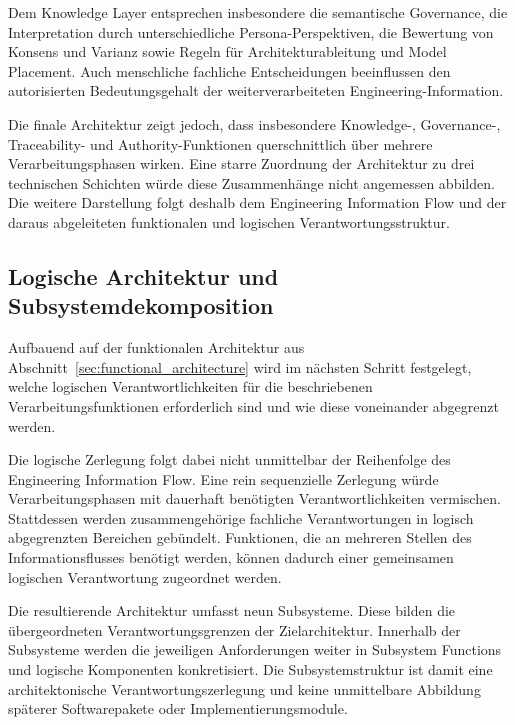 Dem Knowledge Layer entsprechen insbesondere die semantische Governance, die
Interpretation durch unterschiedliche Persona-Perspektiven, die Bewertung von
Konsens und Varianz sowie Regeln für Architekturableitung und Model Placement.
Auch menschliche fachliche Entscheidungen beeinflussen den autorisierten
Bedeutungsgehalt der weiterverarbeiteten Engineering-Information.

Die finale Architektur zeigt jedoch, dass insbesondere Knowledge-,
Governance-, Traceability- und Authority-Funktionen querschnittlich über mehrere
Verarbeitungsphasen wirken. Eine starre Zuordnung der Architektur zu drei
technischen Schichten würde diese Zusammenhänge nicht angemessen abbilden.
Die weitere Darstellung folgt deshalb dem Engineering Information Flow und der
daraus abgeleiteten funktionalen und logischen Verantwortungsstruktur.

\subsection{Logische Architektur und Subsystemdekomposition}
\label{sec:logical_subsystems}

Aufbauend auf der funktionalen Architektur aus
Abschnitt~\ref{sec:functional_architecture} wird im nächsten Schritt
festgelegt, welche logischen Verantwortlichkeiten für die beschriebenen
Verarbeitungsfunktionen erforderlich sind und wie diese voneinander abgegrenzt
werden.

Die logische Zerlegung folgt dabei nicht unmittelbar der Reihenfolge des
Engineering Information Flow. Eine rein sequenzielle Zerlegung würde
Verarbeitungsphasen mit dauerhaft benötigten Verantwortlichkeiten vermischen.
Stattdessen werden zusammengehörige fachliche Verantwortungen in logisch
abgegrenzten Bereichen gebündelt. Funktionen, die an mehreren Stellen des
Informationsflusses benötigt werden, können dadurch einer gemeinsamen
logischen Verantwortung zugeordnet werden.

Die resultierende Architektur umfasst neun Subsysteme. Diese bilden die
übergeordneten Verantwortungsgrenzen der Zielarchitektur. Innerhalb der
Subsysteme werden die jeweiligen Anforderungen weiter in Subsystem Functions
und logische Komponenten konkretisiert. Die Subsystemstruktur ist damit eine
architektonische Verantwortungszerlegung und keine unmittelbare Abbildung
späterer Softwarepakete oder Implementierungsmodule.

